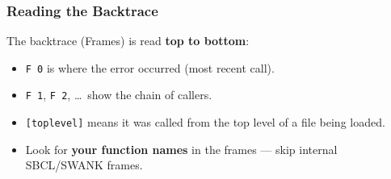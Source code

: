 \subsubsection{Reading the Backtrace}

The backtrace (Frames) is read \textbf{top to bottom}:

\begin{itemize}
  \item \texttt{F 0} is where the error occurred (most recent call).
  \item \texttt{F 1}, \texttt{F 2}, \ldots\ show the chain of callers.
  \item \texttt{[toplevel]} means it was called from the top level of
        a file being loaded.
  \item Look for \textbf{your function names} in the frames --- skip
        internal SBCL/SWANK frames.
\end{itemize}

